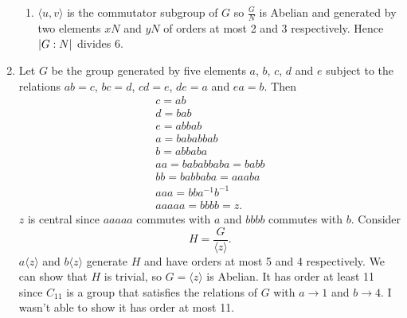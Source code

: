 \documentclass[a4paper, 12pt]{article}
\DeclarePairedDelimiter\abs{\lvert}{\rvert}
\begin{document}
\begin{enumerate}
\begin{enumerate}
\item \(\langle u,v\rangle\) is the commutator subgroup of \(G\) so \(\frac G N\) is Abelian and generated by two elements \(xN\) and \(yN\) of orders at most 2 and 3 respectively. Hence \(\abs{G:N}\) divides 6.

\end{enumerate}

\item Let \(G\) be the group generated by five elements \(a\), \(b\), \(c\), \(d\) and \(e\) subject to the relations \(ab=c\), \(bc=d\), \(cd=e\), \(de=a\) and \(ea=b\). Then
\begin{gather*}
c=ab\\
d=bab\\
e=abbab\\
a=bababbab\\
b=abbaba\\
aa=bababbaba=babb\\
bb=babbaba=aaaba\\
aaa=bba^{-1}b^{-1}\\
aaaaa=bbbb=z.
\end{gather*}
\(z\) is central since \(aaaaa\) commutes with \(a\) and \(bbbb\) commutes with \(b\). Consider
\[H=\frac{G}{\langle z\rangle}.\]
\(a\langle z\rangle\) and \(b\langle z\rangle\) generate \(H\) and have orders at most 5 and 4 respectively. We can show that \(H\) is trivial, so \(G=\langle z\rangle\) is Abelian. It has order at least 11 since \(C_{11}\) is a group that satisfies the relations of \(G\) with \(a\to1\) and \(b\to4\). I wasn't able to show it has order at most 11.

\end{enumerate}
\end{document}
